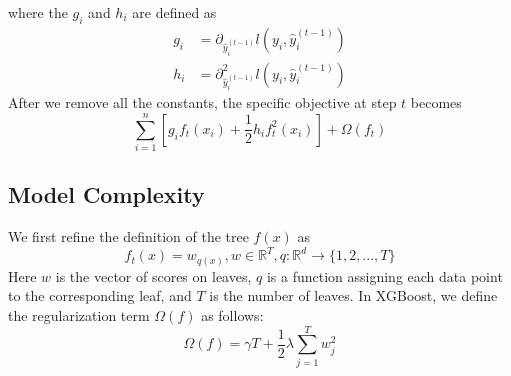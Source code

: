 \documentclass[a4paper, 12pt]{book} %
\begin{document}
where the $g_i$ and $h_i$ are defined as
\begin{equation}
\begin{split}g_i &= \partial_{\hat{y}_i^{(t-1)}} l(y_i, \hat{y}_i^{(t-1)})\\
h_i &= \partial_{\hat{y}_i^{(t-1)}}^2 l(y_i, \hat{y}_i^{(t-1)})\end{split}
\end{equation}
After we remove all the constants, the specific objective at step $t$ becomes
\begin{equation}
\sum_{i=1}^n [g_i f_t(x_i) + \frac{1}{2} h_i f_t^2(x_i)] + \Omega(f_t)
\end{equation}

\subsection{Model Complexity}
We first refine the definition of the tree $f(x)$ as 
$$f_t{(x)}=w_{q(x)}, w\in\mathbb{R}^{T}, q:\mathbb{R}^{d}\to\{1,2,...,T\}$$
Here $w$ is the vector of scores on leaves, $q$ is a function assigning each data point to the corresponding leaf, and $T$ is the number of leaves. In XGBoost, we define the regularization term $\Omega{(f)}$ as follows:
\begin{equation}
\Omega{(f)}=\gamma T+\frac{1}{2}\lambda\sum_{j=1}^{T}{w_j^2}
\end{equation}
\end{document}
